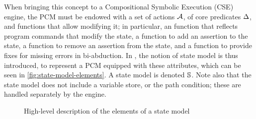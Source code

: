 When bringing this concept to a Compositional Symbolic Execution (CSE) engine, the PCM must be endowed with a set of actions ${\cal{A}}$, of core predicates $\Delta$, and functions that allow modifying it; in particular, an \execac{} function that reflects program commands that modify the state, a \produce{} function to add an assertion to the state, a \consume{} function to remove an assertion from the state, and a \fix{} function to provide fixes for missing errors in bi-abduction. In \cite{cse1,cse2,sacha-phd}, the notion of state model is thus introduced, to represent a PCM equipped with these attributes, which can be seen in \autoref{fig:state-model-elements}. A state model is denoted $\mathbb S$. Note also that the state model does not include a variable store, or the path condition; these are handled separately by the engine.

\begin{figure}\centering
\setlength{\fboxsep}{0.3cm}
\noindent{}%
\vspace{0.2cm}
\caption{High-level description of the elements of a state model}
\label{fig:state-model-elements}
\end{figure}

